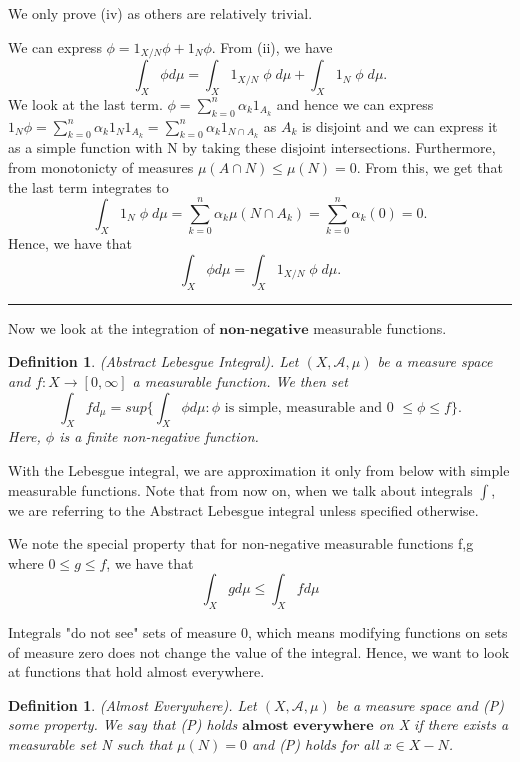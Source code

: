 \documentclass[twoside]{article}
\newtheorem{definition}[theorem]{Definition}
\newenvironment{proof}{{\bf Proof:}}{\hfill\rule{2mm}{2mm}}
\begin{document}
\begin{proof}
We only prove (iv) as others are relatively trivial. 

We can express $\phi = 1_{X/N}\phi + 1_N\phi$. From (ii), we have
$$
\int_X\phi d\mu = \int_X 1_{X/N}\;\phi \;d\mu + \int_X 1_{N}\;\phi \;d\mu.
$$
We look at the last term.
$\phi = \sum_{k=0}^{n}\alpha_k1_{A_k}$ and hence we can express $1_N\phi = \sum_{k=0}^n\alpha_k1_{N}1_{A_k} =\sum_{k=0}^n\alpha_k1_{N \cap A_k}$ as $A_k$ is disjoint and we can express it as a simple function with N by taking these disjoint intersections. Furthermore, from monotonicty of measures $\mu(A \cap N) \leq \mu(N) = 0$. From this, we get that the last term integrates to
$$
\int_X 1_{N}\;\phi \;d\mu = \sum_{k=0}^n\alpha_k\mu(N \cap A_k) = \sum_{k=0}^n\alpha_k(0) = 0.
$$
Hence, we have that 
$$
\int_X\phi d\mu = \int_X 1_{X/N}\;\phi \;d\mu.
$$
\end{proof}

Now we look at the integration of $\textbf{non-negative}$ measurable functions.

\begin{definition}
(Abstract Lebesgue Integral). Let $(X, \mathcal{A}, \mu)$ be a measure space and $f: X \rightarrow [0, \infty]$ a measurable function. We then set 
$$
\int_Xfd_\mu = sup\{\int_X \phi d\mu: \phi \text{ is simple, measurable and 0 }\leq \phi \leq f\}.
$$
Here, $\phi$ is a finite non-negative function.
\end{definition}

With the Lebesgue integral, we are approximation it only from below with simple measurable functions. Note that from now on, when we talk about integrals $\int$, we are referring to the Abstract Lebesgue integral unless specified otherwise.

We note the special property  that for non-negative measurable functions f,g where $0 \leq g \leq f$, we have that
$$
\int_X g d\mu \leq \int_X f d\mu 
$$

Integrals "do not see" sets of measure 0, which means modifying functions on sets of measure zero does not change the value of the integral. Hence, we want to look at functions that hold almost everywhere.

\begin{definition}
(Almost Everywhere). Let $(X, \mathcal{A}, \mu)$ be a measure space and (P) some property. We say that (P) holds $\textbf{almost everywhere}$ on X if there exists a measurable set N such that $\mu(N) = 0$ and (P) holds for all $x \in X - N$.
\end{definition}
\end{document}
